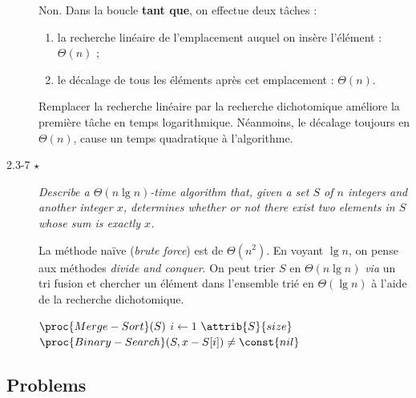 \begin{description}
  \begin{ex}
    Non. Dans la boucle \textbf{tant que}, on effectue deux tâches :
    \begin{enumerate}
      \item la recherche linéaire de l'emplacement auquel on insère l'élément : $\Theta (n)$ ;
      \item le décalage de tous les éléments après cet emplacement : $\Theta (n)$.
    \end{enumerate}
    Remplacer la recherche linéaire par la recherche dichotomique améliore la première tâche en temps logarithmique. Néanmoins, le décalage toujours en $\Theta(n)$, cause un temps quadratique à l'algorithme.
  \end{ex}

\item[2.3-7 $\star$] {\itshape Describe a $\Theta (n \lg n)$-time algorithm that, given a set $S$ of $n$ integers and another integer $x$, determines whether or not there exist two elements in $S$ whose sum is exactly $x$.}

\begin{ex}
    La méthode naïve (\textit{brute force}) est de $\Theta(n^2)$. En voyant $\lg n$, on pense aux méthodes \textit{divide and conquer}. On peut trier $S$ en $\Theta(n\lg n)$ \textit{via} un tri fusion et chercher un élément dans l'ensemble trié en $\Theta(\lg n)$  à l'aide de la recherche dichotomique.
\begin{codebox}
    \li $\proc{Merge-Sort}(S)$
    \li \For $i \gets 1$ \To $\attrib{S}{size}$ \Do
      \li \If $\proc{Binary-Search}(S, x - S[i]) \neq \const{nil}$ \Then
        \li \Return {} \End
    \End
    \li  \Return {} 
\end{codebox}
\end{ex}

\end{description}

\subsection{Problems}

